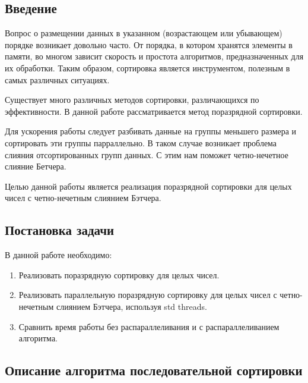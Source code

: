 \documentclass{report}
\begin{document}
\setcounter{page}{2}

\tableofcontents

\newpage
\begin{center}
\section*{Введение}
\end{center}

Вопрос о размещении данных в указанном (возрастающем или убывающем) порядке возникает довольно часто. От порядка, в котором хранятся элементы в памяти, во многом зависит скорость и простота алгоритмов, предназначенных для их обработки. Таким образом, сортировка является инструментом, полезным в самых различных ситуациях.
\par Существует много различных методов сортировки, различающихся по эффективности. В данной работе рассматривается метод поразрядной сортировки.
\par Для ускорения работы следует разбивать данные на группы меньшего размера и сортировать эти группы парраллельно. В таком случае возникает проблема слияния отсортированных групп данных. С этим нам поможет четно-нечетное слияние Бетчера.
\par Целью данной работы является реализация поразрядной сортировки для целых чисел с четно-нечетным слиянием Бэтчера. 

\newpage
\begin{center}
\section*{Постановка задачи}
\end{center}

В данной работе необходимо:
\begin{enumerate}
\item Реализовать поразрядную сортировку для целых чисел.
\item Реализовать параллельную поразрядную сортировку для целых чисел с четно-нечетным слиянием Бэтчера, используя std threads. 
\item Сравнить время работы без распараллеливания и с распараллеливанием алгоритма.
\end{enumerate}

\newpage
\begin{center}
\section*{Описание алгоритма последовательной сортировки}
\end{center}
\end{document}
